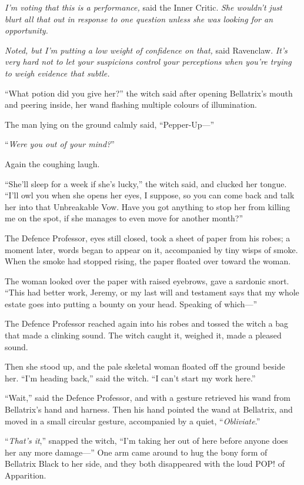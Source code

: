 \emph{I’m voting that this is a performance,} said the Inner Critic. \emph{She wouldn’t just blurt all that out in response to one question unless she was looking for an opportunity.}

\emph{Noted, but I’m putting a low weight of confidence on that,} said Ravenclaw. \emph{It’s very hard not to let your suspicions control your perceptions when you’re trying to weigh evidence that subtle.}

“What potion did you give her?” the witch said after opening Bellatrix’s mouth and peering inside, her wand flashing multiple colours of illumination.

The man lying on the ground calmly said, “Pepper-Up—”

“\emph{Were you out of your mind?}”

Again the coughing laugh.

“She’ll sleep for a week if she’s lucky,” the witch said, and clucked her tongue. “I’ll owl you when she opens her eyes, I suppose, so you can come back and talk her into that Unbreakable Vow. Have you got anything to stop her from killing me on the spot, if she manages to even move for another month?”

The Defence Professor, eyes still closed, took a sheet of paper from his robes; a moment later, words began to appear on it, accompanied by tiny wisps of smoke. When the smoke had stopped rising, the paper floated over toward the woman.

The woman looked over the paper with raised eyebrows, gave a sardonic snort. “This had better work, Jeremy, or my last will and testament says that my whole estate goes into putting a bounty on your head. Speaking of which—”

The Defence Professor reached again into his robes and tossed the witch a bag that made a clinking sound. The witch caught it, weighed it, made a pleased sound.

Then she stood up, and the pale skeletal woman floated off the ground beside her. “I’m heading back,” said the witch. “I can’t start my work here.”

“Wait,” said the Defence Professor, and with a gesture retrieved his wand from Bellatrix’s hand and harness. Then his hand pointed the wand at Bellatrix, and moved in a small circular gesture, accompanied by a quiet, “\emph{Obliviate}.”

“\emph{That’s it},” snapped the witch, “I’m taking her out of here before anyone does her any more damage—” One arm came around to hug the bony form of Bellatrix Black to her side, and they both disappeared with the loud POP! of Apparition.

